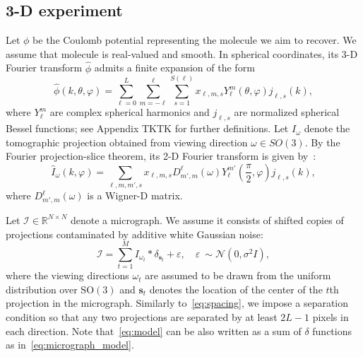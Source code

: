 \documentclass[english,11pt]{article}
\newcommand{\1}{\mathbf{1}}
\newcommand{\II}{\mathcal{I}}
\newcommand{\mb}{\mathbf}
\newcommand{\TODO}[1]{{\color{red}{[#1]}}}
\numberwithin{equation}{section}
\theoremstyle{plain}
\theoremstyle{definition}
\theoremstyle{remark}
\theoremstyle{plain}
\theoremstyle{remark}
\theoremstyle{plain}
\theoremstyle{plain}
\newcommand{\tamir}{x}
\newcommand{\RNN}{\mathbb{R}^{N\times N}}
\newcommand{\be}{\begin{equation}}
\newcommand{\ee}{\end{equation}}
\begin{document}
\subsection{3-D experiment}

Let $\phi$ be the Coulomb potential representing the molecule we aim to recover. 
We assume that molecule is real-valued and smooth. In spherical coordinates, its 3-D Fourier transform $\widehat\phi$ admits a finite expansion of the form
\be\label{eq:volume_expansion} 
\widehat \phi(k, \theta, \varphi) = \sum_{\ell = 0}^L\sum_{m=-\ell}^{\ell}\sum_{s=1}^{S(\ell)}\tamir_{\ell, m, s}Y_{\ell}^m(\theta,\varphi)j_{\ell,s}(k),
\ee
where $Y_{\ell}^m$ are complex spherical harmonics and $j_{\ell,s}$ are normalized spherical Bessel functions; see Appendix TKTK for further definitions.  Let $I_{\omega}$ denote the tomographic projection obtained from viewing direction $\omega\in SO(3)$. By the Fourier projection-slice theorem, its 2-D Fourier transform  is given by~\cite{natterer1986mathematics}:
\be\label{eq:projection_model}
\widehat I_{\omega}(k,\varphi) = \sum_{\ell,m,m',s}\tamir_{\ell,m,s}D_{m',m}^{\ell}(\omega)Y_{\ell}^{m'}\left(\frac{\pi}{2},\varphi\right)j_{\ell,s}(k),\ee
where $D_{m',m}^{\ell}(\omega)$ is a Wigner-D matrix.

Let $\II\in\RNN$ denote a micrograph. We assume it consists of shifted copies of projections contaminated by additive white Gaussian noise:
\begin{equation}\label{eq:micrograph_model}
\II = \sum_{t=1}^{M} I_{\omega_t}\ast\delta_{\mb s_t}+ \varepsilon, \quad \varepsilon~\sim\mathcal{N}(0,\sigma^2 I),
\end{equation}
where the viewing directions $\omega_t$ are assumed to be drawn from the uniform distribution over $\text{SO}(3)$ and $\mb s_t$ denotes the location of the center of the $t$th projection in the micrograph. Similarly to~\eqref{eq:spacing}, we impose a separation condition so that any two projections are separated by at least $2L-1$ \TODO{2L?} pixels in each direction.
Note that~\eqref{eq:model} can be also written as a sum of $\delta$ functions as in~\eqref{eq:micrograph_model}. 
\end{document}
